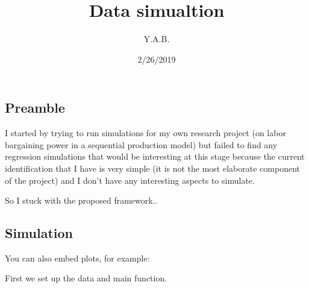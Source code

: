 \documentclass[]{article}
\title{Data simualtion}
\author{Y.A.B.}
\date{2/26/2019}
\begin{document}
\maketitle

\hypertarget{preamble}{%
\subsection{Preamble}\label{preamble}}

I started by trying to run simulations for my own research project (on
labor bargaining power in a sequential production model) but failed to
find any regression simulations that would be interesting at this stage
because the current identification that I have is very simple (it is not
the most elaborate component of the project) and I don't have any
interesting aspects to simulate.

So I stuck with the proposed framework..

\hypertarget{simulation}{%
\subsection{Simulation}\label{simulation}}

You can also embed plots, for example:

First we set up the data and main function.
\end{document}
